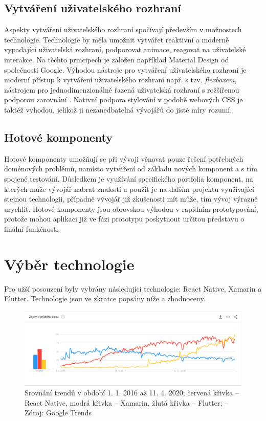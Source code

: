 \subsection{Vytváření uživatelského rozhraní}

Aspekty vytváření uživatelského rozhraní spočívají především v možnostech technologie. Technologie by měla umožnit vytvářet reaktivní a moderně vypadající uživatelská rozhraní, podporovat animace, reagovat na uživatelské interakce. Na těchto principech je založen například Material Design od společnosti Google. Výhodou nástroje pro vytváření uživatelského rozhraní je moderní přístup k vytváření uživatelského rozhraní např. s tzv. \emph{flexboxem}, nástrojem pro jednodimenzionálně řazená uživatelská rozhraní s rožšířenou podporou zarovnání \cite{FlexboxMDN}. Nativní podpora stylování v podobě webových CSS je taktéž vyhodou, jelikož ji nezanedbatelná vývojářů do jisté míry rozumí.

\subsection{Hotové komponenty}

Hotové komponenty umožňují se při vývoji věnovat pouze řešení potřebných doménových problémů, namísto vytváření od základu nových komponent a s tím spojené testování. Důsledkem je využívání specifického portfolia komponent, na kterých může vývojář nabrat znalosti a použít je na dalším projektu využívající stejnou technologii, případně vývojář již zkušenosti mít může, tím vývoj výrazně urychlit. Hotové komponenty jsou obrovskou výhodou v rapidním prototypování, protože mohou aplikaci již ve fázi prototypu poskytnout určitou představu o finální funkčnosti.

\section{Výběr technologie}


Pro užší posouzení byly vybrány následující technologie: React Native, Xamarin a Flutter. Technologie jsou ve zkratce popsány níže a zhodnoceny.

\begin{figure}[h]
	\includegraphics[width=\linewidth]{img/google_trends.png}
	\caption[Srovnání trendů technologií pro mobilní vývoj]{Srovnání trendů v období 1. 1. 2016 až 11. 4. 2020; červená křivka -- React Native, modrá křivka -- Xamarin, žlutá křivka -- Flutter; -- Zdroj: Google Trends}
	\label{fig:gtrends}
\end{figure}


